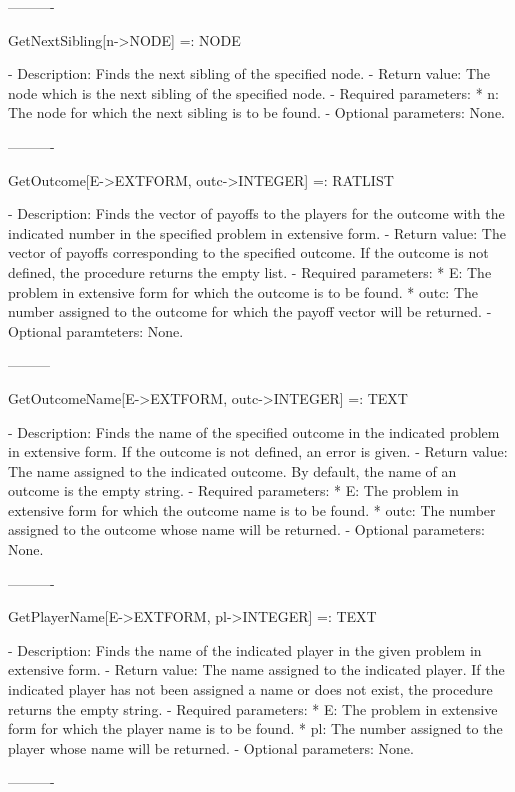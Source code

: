 ----------

GetNextSibling[n->NODE] =: NODE

   -	Description:  Finds the next sibling of the specified node.
   -	Return value:  The node which is the next sibling of the specified 
	node.
   -	Required parameters:
	  *  n:  The node for which the next sibling is to be found.
   -	Optional parameters:  None.

----------

GetOutcome[E->EXTFORM, outc->INTEGER] =: RATLIST

   -	Description:  Finds the vector of payoffs to the players for the 
	outcome with the indicated number in the specified problem in extensive
	form.
   -	Return value:  The vector of payoffs corresponding to the specified 
	outcome.  If the outcome is not defined, the procedure returns the 
	empty list.
   -	Required parameters:
	  *  E:  The problem in extensive form for which the outcome is to be
	     found.
	  *  outc:  The number assigned to the outcome for which the payoff 
	     vector will be returned.
   -	Optional paramteters:  None.

---------

GetOutcomeName[E->EXTFORM, outc->INTEGER] =: TEXT

   -	Description:  Finds the name of the specified outcome in the indicated
	problem in extensive form.  If the outcome is not defined, an error is
	given.
   -	Return value:  The name assigned to the indicated outcome.  By default,
	the name of an outcome is the empty string.
   -	Required parameters:
	  *  E:  The problem in extensive form for which the outcome name is to
	     be found.
	  *  outc:  The number assigned to the outcome whose name will be 
	     returned.
   -	Optional parameters:  None.

----------

GetPlayerName[E->EXTFORM, pl->INTEGER] =: TEXT

   -	Description:  Finds the name of the indicated player in the given 
	problem in extensive form.
   -	Return value:  The name assigned to the indicated player.  If the 
	indicated player has not been assigned a name or does not exist, the
	procedure returns the empty string.
   -	Required parameters:
	  *  E:  The problem in extensive form for which the player name is to
	     be found.
	  *  pl:  The number assigned to the player whose name will be 
	     returned.
   -	Optional parameters:  None.

----------

